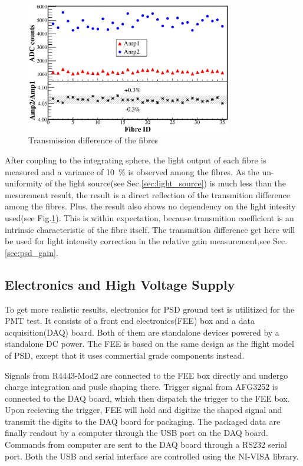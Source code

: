 \documentclass[5p, times]{elsarticle}
\begin{document}
\begin{figure}[h!]
 \centering
 \includegraphics[width=90mm]{fibre_diff}
\caption{Transmission difference of the fibres}
\label{fig:fibre_diff}
\end{figure} 

After coupling to the integrating sphere, the light output of each fibre is measured and a variance of \SI{10}{\percent} is observed among the fibres. 
As the un-uniformity of the light source(see Sec.\ref{sec:light_source}) is much less than the mesurement result, the result is a direct reflection of the transmition difference among the fibres.
Plus, the result also shows no dependency on the light intesity used(see Fig.\ref{fig:fibre_diff}). 
This is within expectation, because transmition coefficient is an intrinsic characteristic of the fibre itself.
The transmition difference get here will be used for light intensity correction in the relative gain measurement,see Sec.\ref{sec:psd_gain}.


\subsection{Electronics and High Voltage Supply}
\label{sec:electronics}

To get more realistic results, electronics for PSD ground test is utilitized for the PMT test.
It consists of a front end electronics(FEE) box and a data acquisition(DAQ) board.
Both of them are standalone devices powered by a standalone DC power.
The FEE is based on the same design as the flight model of PSD, except that it uses commertial grade components instead.

Signals from R4443-Mod2 are connected to the FEE box directly and undergo charge integration and pusle shaping there.
Trigger signal from AFG3252 is connected to the DAQ board, which then dispatch the trigger to the FEE box.
Upon recieving the trigger, FEE will hold and digitize the shaped signal and transmit the digits to the DAQ board for packaging.
The packaged data are finally readout by a computer through the USB port on the DAQ board.
Commands from computer are sent to the DAQ board through a RS232 serial port.
Both the USB and serial interface are controlled using the NI-VISA library.
\end{document}
